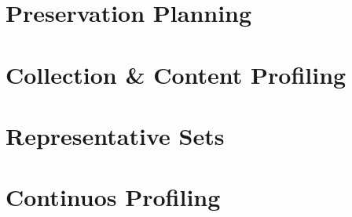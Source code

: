 \section{Preservation Planning}

\section{Collection \& Content Profiling}

\section{Representative Sets}

\section{Continuos Profiling}
